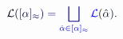 \documentclass[12pt]{article}
\begin{document}
\makeatletter
\renewcommand*{\@textcolor}[3]{%
  \protect\leavevmode
  \begingroup
    \color#1{#2}#3%
  \endgroup
}
\makeatother
\begin{displaymath}
\mathcal { \mathcolor[RGB]{0,0,15}{L} } \mathcolor[RGB]{0,0,30}{(} \mathcolor[RGB]{0,0,45}{[} \mathcolor[RGB]{0,0,60}{\alpha} \mathcolor[RGB]{0,0,75}{]} _ { \mathcolor[RGB]{0,0,90}{\approx} } \mathcolor[RGB]{0,0,105}{)} \mathcolor[RGB]{0,0,120}{=} \mathcolor[RGB]{0,0,135}{\bigsqcup} _ { \mathcolor[RGB]{0,0,150}{\hat { \mathcolor[RGB]{0,0,165}{\alpha} } } \mathcolor[RGB]{0,0,180}{\in} \mathcolor[RGB]{0,0,195}{[} \mathcolor[RGB]{0,0,210}{\alpha} \mathcolor[RGB]{0,0,225}{]} _ { \mathcolor[RGB]{0,0,240}{\approx} } } \mathcal { \mathcolor[RGB]{0,0,255}{L} } \mathcolor[RGB]{0,15,0}{(} \mathcolor[RGB]{0,15,15}{\hat { \mathcolor[RGB]{0,15,30}{\alpha} } } \mathcolor[RGB]{0,15,45}{)} \mathcolor[RGB]{0,15,60}{.}
\end{displaymath}
\end{document}
